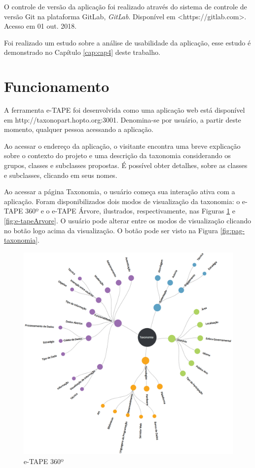 \par
O controle de versão da aplicação foi realizado através do sistema de controle de versão Git na plataforma GitLab, \textit{GitLab}. 
Disponível em <https://gitlab.com>. Acesso em 01 out. 2018.

\par
Foi realizado um estudo sobre a análise de usabilidade da aplicação, esse estudo é demonstrado no Capítulo \ref{cap:cap4} deste trabalho.
\newpage

\section{Funcionamento}
\label{sec:funcionamento}
A ferramenta e-TAPE foi desenvolvida como uma aplicação web está disponível em http://taxonopart.hopto.org:3001. Denomina-se por usuário, a partir deste momento, qualquer pessoa acessando a aplicação. 

\par
Ao acessar o endereço da aplicação, o visitante encontra uma breve explicação sobre o contexto do projeto e uma descrição da taxonomia considerando os grupos,
classes e subclasses propostas. É possível obter detalhes, sobre as classes e subclasses, clicando em seus nomes. 

\par
Ao acessar a página Taxonomia, o usuário começa sua interação ativa com a aplicação.
Foram disponibilizados dois modos de visualização da taxonomia: o e-TAPE 360º e o e-TAPE Árvore, ilustrados, respectivamente,
nas Figuras \ref{fig:e-tape360} e \ref{fig:e-tapeArvore}. O usuário pode alterar entre os modos de visualização clicando no botão logo acima da visualização.
O botão pode ser visto na Figura \ref{fig:pag-taxonomia}.

\vspace{1cm}

\begin{figure}[!ht]
    \centering
    \includegraphics[scale=0.20]{./figuras/taxonomia-cropped.png}
    \caption{e-TAPE 360º}
    \label{fig:e-tape360}
\end{figure}

